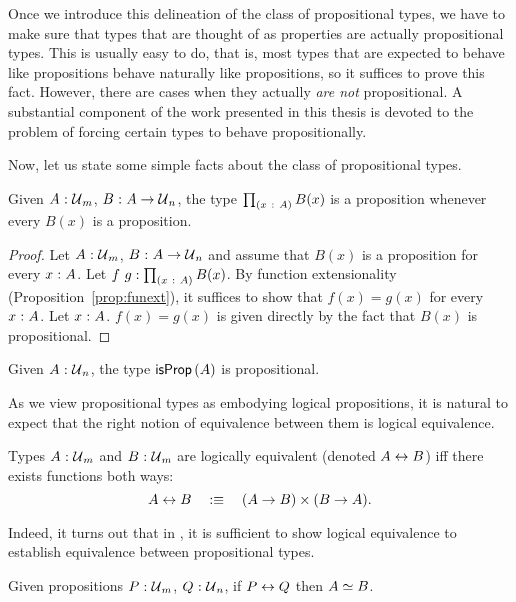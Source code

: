 Once we introduce this delineation of the class of propositional types, we have to make
sure that types that are thought of as properties are actually propositional types. This
is usually easy to do, that is, most types that are expected to behave like propositions
behave naturally like propositions, so it suffices to prove this fact. However, there are
cases when they actually \emph{are not} propositional. A substantial component of the work
presented in this thesis is devoted to the problem of forcing certain types to behave
propositionally.

Now, let us state some simple facts about the class of propositional types.

\begin{prop}\label{thm:pi-prop}
  Given $A\hspace{0.1mm}:\hspace{0.1mm}\mathcal{U}{}_m$, $B\hspace{0.1mm}:\hspace{0.1mm}A \rightarrow \mathcal{U}{}_n$, the type $\prod_{(x~:~A)} B(x)$
  is a proposition whenever every $B(x)$ is a proposition.
\end{prop}
\begin{proof}
  Let $A\hspace{0.1mm}:\hspace{0.1mm}\mathcal{U}{}_m$, $B\hspace{0.1mm}:\hspace{0.1mm}A \rightarrow \mathcal{U}{}_n$ and assume that $B(x)$ is a
  proposition for every $x\hspace{0.1mm}:\hspace{0.1mm}A$. Let $f~g:\prod_{(x~:~A)} B(x)$. By
  function extensionality (Proposition~\ref{prop:funext}), it suffices to show that $f(x)
  = g(x)$ for every $x\hspace{0.1mm}:\hspace{0.1mm}A$. Let $x\hspace{0.1mm}:\hspace{0.1mm}A$. $f(x) = g(x)$ is given directly by
  the fact that $B(x)$ is propositional.
\end{proof}

\begin{prop}
  Given $A\hspace{0.1mm}:\hspace{0.1mm}\mathcal{U}{}_n$, the type $\mathsf{isProp}\left(A\right)$ is propositional.
\end{prop}

As we view propositional types as embodying logical propositions, it is natural to
expect that the right notion of equivalence between them is logical equivalence.
\begin{defn}\label{defn:iff}
  Types $A\hspace{0.1mm}:\hspace{0.1mm}\mathcal{U}{}_m$ and $B\hspace{0.1mm}:\hspace{0.1mm}\mathcal{U}{}_m$ are logically equivalent
  (denoted $A \leftrightarrow B$) iff there exists functions both ways:
  \begin{equation*}
    A \leftrightarrow B \quad:\equiv\quad (A \rightarrow B) \times (B \rightarrow A).
  \end{equation*}
\end{defn}
Indeed, it turns out that in \UF{}, it is sufficient to show logical equivalence to
establish equivalence between propositional types.
\begin{prop}\label{prop:iff-equiv}
  Given propositions $P\hspace{0.1mm}:\hspace{0.1mm}\mathcal{U}{}_m$, $Q\hspace{0.1mm}:\hspace{0.1mm}\mathcal{U}{}_n$, if $P \leftrightarrow Q$
  then $A \simeq B$.
\end{prop}

